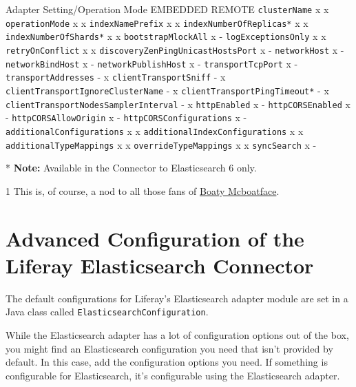 Adapter Setting/Operation Mode \textbar{} EMBEDDED \textbar{} REMOTE
\textbar{} \texttt{clusterName} \textbar{} x \textbar{} x
\texttt{operationMode} \textbar{} x \textbar{} x
\texttt{indexNamePrefix} \textbar{} x \textbar{} x
\texttt{indexNumberOfReplicas*} \textbar{} x \textbar{} x
\texttt{indexNumberOfShards*} \textbar{} x \textbar{} x
\texttt{bootstrapMlockAll} \textbar{} x \textbar{} -
\texttt{logExceptionsOnly} \textbar{} x \textbar{} x
\texttt{retryOnConflict} \textbar{} x \textbar{} x
\texttt{discoveryZenPingUnicastHostsPort} \textbar{} x \textbar{} -
\texttt{networkHost} \textbar{} x \textbar{} - \texttt{networkBindHost}
\textbar{} x \textbar{} - \texttt{networkPublishHost} \textbar{} x
\textbar{} - \texttt{transportTcpPort} \textbar{} x \textbar{} -
\texttt{transportAddresses} \textbar{} - \textbar{} x
\texttt{clientTransportSniff} \textbar{} - \textbar{} x
\texttt{clientTransportIgnoreClusterName} \textbar{} - \textbar{} x
\texttt{clientTransportPingTimeout*} \textbar{} - \textbar{} x
\texttt{clientTransportNodesSamplerInterval} \textbar{} - \textbar{} x
\texttt{httpEnabled} \textbar{} x \textbar{} - \texttt{httpCORSEnabled}
\textbar{} x \textbar{} - \texttt{httpCORSAllowOrigin} \textbar{} x
\textbar{} - \texttt{httpCORSConfigurations} \textbar{} x \textbar{} -
\texttt{additionalConfigurations} \textbar{} x \textbar{} x
\texttt{additionalIndexConfigurations} \textbar{} x \textbar{} x
\texttt{additionalTypeMappings} \textbar{} x \textbar{} x
\texttt{overrideTypeMappings} \textbar{} x \textbar{} x
\texttt{syncSearch} \textbar{} x \textbar{} -

* \textbf{Note:} Available in the Connector to Elasticsearch 6 only.

1 This is, of course, a nod to all those fans of
\href{http://www.theatlantic.com/international/archive/2016/05/boaty-mcboatface-parliament-lessons/482046}{Boaty
Mcboatface}.

\section{Advanced Configuration of the Liferay Elasticsearch
Connector}\label{advanced-configuration-of-the-liferay-elasticsearch-connector}

The default configurations for Liferay's Elasticsearch adapter module
are set in a Java class called \texttt{ElasticsearchConfiguration}.

While the Elasticsearch adapter has a lot of configuration options out
of the box, you might find an Elasticsearch configuration you need that
isn't provided by default. In this case, add the configuration options
you need. If something is configurable for Elasticsearch, it's
configurable using the Elasticsearch adapter.

